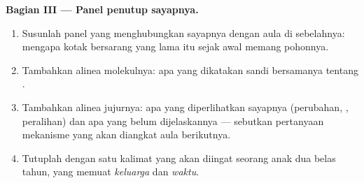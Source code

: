 \begin{problem}
\medskip\noindent\textbf{Bagian III --- Panel penutup
sayapnya.}
\begin{enumerate}[resume]
  \item Susunlah panel yang menghubungkan sayapnya dengan
        aula  di sebelahnya: mengapa kotak
        bersarang yang lama itu sejak awal memang pohonnya.
  \item Tambahkan alinea molekulnya: apa yang dikatakan sandi
        bersamanya tentang .
  \item Tambahkan alinea jujurnya: apa yang diperlihatkan
        sayapnya (perubahan, , peralihan) dan apa
        yang belum dijelaskannya --- sebutkan pertanyaan
        mekanisme yang akan diangkat aula berikutnya.
  \item Tutuplah dengan satu kalimat yang akan diingat
        seorang anak dua belas tahun, yang memuat
        \emph{keluarga} dan \emph{waktu}.
\end{enumerate}
\end{problem}
